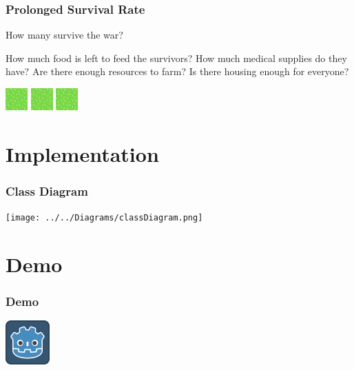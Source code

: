 \documentclass[ascpectratio=169]{beamer}
\begin{document}
\begin{frame}

  \frametitle{Prolonged Survival Rate}

  \begin{center}
    {\large How many survive the war?}
  \end{center}

  \begin{outline}
    \1 How much food is left to feed the survivors?
    \1 How much medical supplies do they have?
    \1 Are there enough resources to farm?
    \1 Is there housing enough for everyone?
  \end{outline}

  \begin{center}
    \includegraphics[scale=2.0, trim=2cm 0 0 0]{../../Images/grasstile.png}
    \includegraphics[scale=2.0]{../../Images/grasstile.png}
    \includegraphics[scale=2.0, trim=0 0 2cm 0]{../../Images/grasstile.png}
  \end{center}
  
\end{frame}


\section{Implementation}


\begin{frame}

  \frametitle{Class Diagram}

  \begin{center}
    \texttt{[image: ../../Diagrams/classDiagram.png]}
  \end{center}

\end{frame}


\section{Demo}


\begin{frame}

  \frametitle{Demo}

  \begin{center}
    \includegraphics[scale=1.5]{../../Preparation/icon.png}
  \end{center}

\end{frame}

\end{document}
